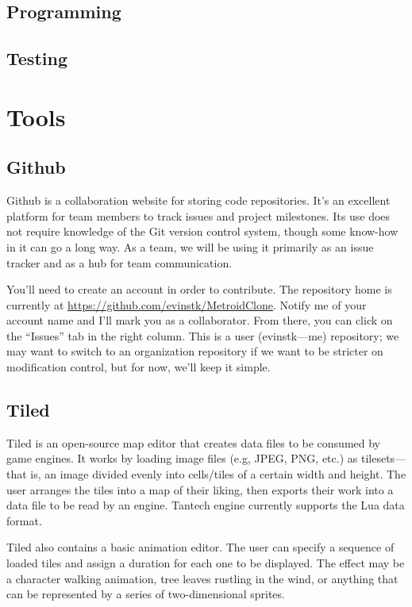 \documentclass{article}
\begin{document}
\subsection*{Programming}

\subsection*{Testing}

\section{Tools}

\subsection*{Github}
Github is a collaboration website for storing code repositories. It's an excellent platform for team members to track issues and project milestones. Its use does not require knowledge of the Git version control system, though some know-how in it can go a long way. As a team, we will be using it primarily as an issue tracker and as a hub for team communication.

You'll need to create an account in order to contribute. The repository home is currently at \url{https://github.com/evinstk/MetroidClone}. Notify me of your account name and I'll mark you as a collaborator. From there, you can click on the ``Issues'' tab in the right column. This is a user (evinstk---me) repository; we may want to switch to an organization repository if we want to be stricter on modification control, but for now, we'll keep it simple.

\subsection*{Tiled}
Tiled is an open-source map editor that creates data files to be consumed by game engines. It works by loading image files (e.g, JPEG, PNG, etc.) as tilesets---that is, an image divided evenly into cells/tiles of a certain width and height. The user arranges the tiles into a map of their liking, then exports their work into a data file to be read by an engine. Tantech engine currently supports the Lua data format.

Tiled also contains a basic animation editor. The user can specify a sequence of loaded tiles and assign a duration for each one to be displayed. The effect may be a character walking animation, tree leaves rustling in the wind, or anything that can be represented by a series of two-dimensional sprites.
\end{document}

